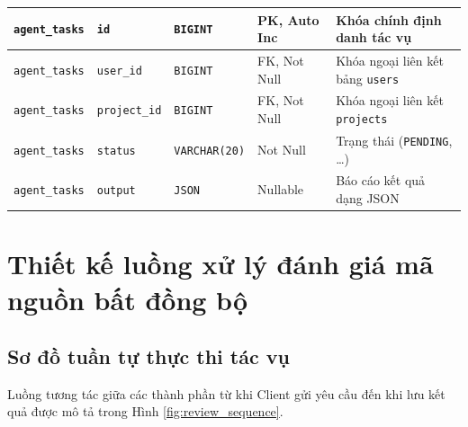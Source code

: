\documentclass[12pt,a4paper]{report}
\begin{document}
\begin{table}[H]
\begin{tabular}{|p{2.5cm}|p{2.5cm}|p{2.2cm}|p{2.2cm}|p{4.2cm}|}
\texttt{agent\_tasks} & \texttt{id} & \texttt{BIGINT} & PK, Auto Inc & Khóa chính định danh tác vụ \\ \hline
\texttt{agent\_tasks} & \texttt{user\_id} & \texttt{BIGINT} & FK, Not Null & Khóa ngoại liên kết bảng \texttt{users} \\ \hline
\texttt{agent\_tasks} & \texttt{project\_id} & \texttt{BIGINT} & FK, Not Null & Khóa ngoại liên kết \texttt{projects} \\ \hline
\texttt{agent\_tasks} & \texttt{status} & \texttt{VARCHAR(20)} & Not Null & Trạng thái (\texttt{PENDING}, \dots) \\ \hline
\texttt{agent\_tasks} & \texttt{output} & \texttt{JSON} & Nullable & Báo cáo kết quả dạng JSON \\ \hline
\end{tabular}
\end{table}

\section{Thiết kế luồng xử lý đánh giá mã nguồn bất đồng bộ}

\subsection{Sơ đồ tuần tự thực thi tác vụ}
Luồng tương tác giữa các thành phần từ khi Client gửi yêu cầu đến khi lưu kết quả được mô tả trong Hình \ref{fig:review_sequence}.
\end{document}
